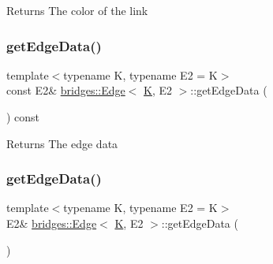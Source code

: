 \begin{DoxyReturn}{Returns}
The color of the link 
\end{DoxyReturn}
\mbox{\label{classbridges_1_1_edge_a36e99b58bb9a3a04323ba9232673abca}} 
\subsubsection{\texorpdfstring{getEdgeData()}{getEdgeData()}\hspace{0.1cm}{\footnotesize\ttfamily [1/2]}}
{\footnotesize\ttfamily template$<$typename K, typename E2 = K$>$ \\
const E2\& \mbox{\hyperlink{classbridges_1_1_edge}{bridges\+::\+Edge}}$<$ \mbox{\hyperlink{namespacebridges_acfb0a4f7877d8f63de3e6862004c50edaa5f3c6a11b03839d46af9fb43c97c188}{K}}, E2 $>$\+::get\+Edge\+Data (\begin{DoxyParamCaption}{ }\end{DoxyParamCaption}) const\hspace{0.3cm}{\ttfamily [inline]}}

\begin{DoxyReturn}{Returns}
The edge data 
\end{DoxyReturn}
\mbox{\label{classbridges_1_1_edge_a59ce201560b26ec18a1947a38c82e36f}} 
\subsubsection{\texorpdfstring{getEdgeData()}{getEdgeData()}\hspace{0.1cm}{\footnotesize\ttfamily [2/2]}}
{\footnotesize\ttfamily template$<$typename K, typename E2 = K$>$ \\
E2\& \mbox{\hyperlink{classbridges_1_1_edge}{bridges\+::\+Edge}}$<$ \mbox{\hyperlink{namespacebridges_acfb0a4f7877d8f63de3e6862004c50edaa5f3c6a11b03839d46af9fb43c97c188}{K}}, E2 $>$\+::get\+Edge\+Data (\begin{DoxyParamCaption}{ }\end{DoxyParamCaption})\hspace{0.3cm}{\ttfamily [inline]}}

